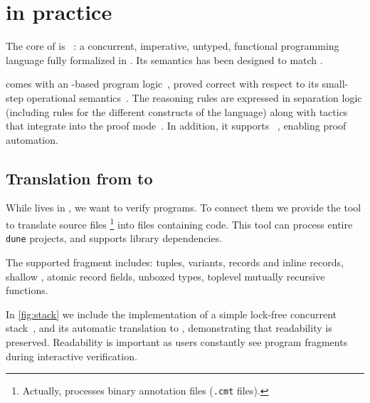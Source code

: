 \section{\Zoo in practice}
\label{sec:zoo}


The core of \Zoo is \ZooLang~: a concurrent, imperative, untyped, functional programming language fully formalized in \Rocq.
Its semantics has been designed to match \OCaml.

\ZooLang comes with an \Iris-based program logic~, proved correct with respect to its small-step operational semantics~.
The reasoning rules are expressed in separation logic (including rules for the different constructs of the language) along with \Rocq tactics~ that integrate into the \Iris proof mode~\citep{DBLP:journals/pacmpl/KrebbersJ0TKTCD18}.
In addition, it supports \Diaframe~\citep{DBLP:conf/pldi/MulderKG22,DBLP:journals/pacmpl/MulderK23}, enabling proof automation.

\subsection{Translation from \OCaml to \ZooLang}



While \ZooLang lives in \Rocq, we want to verify \OCaml programs.
To connect them we provide the tool \ocamlToZoo to translate \OCaml source files%
\footnote{
Actually, \ocamlToZoo processes binary annotation files (\texttt{.cmt} files).
}
into \Rocq files containing \ZooLang code.
This tool can process entire \texttt{dune} projects, and supports library dependencies.

The supported \OCaml fragment includes: tuples, variants, records and inline records, shallow , atomic record fields, unboxed types, toplevel mutually recursive functions.

In \cref{fig:stack} we include the \OCaml implementation of a simple lock-free concurrent stack~\citep{thomas1986systems}, and its automatic translation to \ZooLang, demonstrating that readability is preserved.
Readability is important as users constantly see program fragments during interactive verification.

